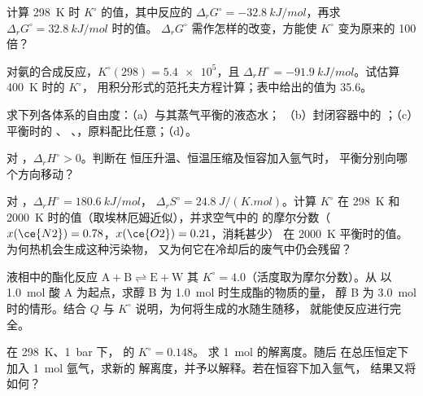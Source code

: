\begin{exercise}[$\star$]\label{exo:b2:equilibrium-shifts:1}
计算 \qty{298}{K} 时 $K^\circ$ 的值，其中反应的 $\Delta_r G^\circ =
\qty{-32.8}{kJ/mol}$，再求 $\Delta_r G^\circ = \qty{+32.8}{kJ/mol}$ 时的值。
$\Delta_r G^\circ$ 需作怎样的改变，方能使 $K^\circ$ 变为原来的 100 倍？
\end{exercise}

\begin{exercise}[$\star$]\label{exo:b2:equilibrium-shifts:2}
对氨的合成反应，$K^\circ(298) = \num{5.4e5}$，且 $\Delta_r H^\circ =
\qty{-91.9}{kJ/mol}$。试估算 \qty{400}{K} 时的 $K^\circ$，
用积分形式的范托夫方程计算；表中给出的值为 35.6。
\end{exercise}

\begin{exercise}[$\star$]\label{exo:b2:equilibrium-shifts:3}
求下列各体系的自由度：（a）与其蒸气平衡的液态水；
（b）封闭容器中的 ；（c）平衡时的 、
、，原料配比任意；（d）。
\end{exercise}

\begin{exercise}[$\star$]\label{exo:b2:equilibrium-shifts:4}
对 ，$\Delta_r H^\circ > 0$。判断在
恒压升温、恒温压缩及恒容加入氩气时，
平衡分别向哪个方向移动？
\end{exercise}

\begin{exercise}[$\star\star$]\label{exo:b2:equilibrium-shifts:5}
对 ，$\Delta_r H^\circ = \qty{180.6}{kJ/mol}$，
$\Delta_r S^\circ = \qty{24.8}{J/(K.mol)}$。计算 $K^\circ$ 在 \qty{298}{K}
和 \qty{2000}{K} 时的值（取埃林厄姆近似），并求空气中的
 的摩尔分数（$x(\ce{N2}) = 0.78$，$x(\ce{O2}) = 0.21$，消耗甚少）
在 \qty{2000}{K} 平衡时的值。为何热机会生成这种污染物，
又为何它在冷却后的废气中仍会残留？
\end{exercise}

\begin{exercise}[$\star\star$]\label{exo:b2:equilibrium-shifts:6}
液相中的酯化反应 $\mathrm{A + B \rightleftharpoons E + W}$
其 $K^\circ = 4.0$（活度取为摩尔分数）。从
以 \qty{1.0}{mol} 酸 A 为起点，求醇 B 为 \qty{1.0}{mol} 时生成酯的物质的量，
醇 B 为 \qty{3.0}{mol} 时的情形。结合 $Q$ 与 $K^\circ$ 说明，为何将生成的水随生随移，
就能使反应进行完全。
\end{exercise}

\begin{exercise}[$\star\star$]\label{exo:b2:equilibrium-shifts:7}
在 \qty{298}{K}、\qty{1}{bar} 下， 的 $K^\circ = 0.148$。
求 \qty{1}{mol}  的解离度。随后
在总压恒定下加入 \qty{1}{mol} 氩气，求新的
解离度，并予以解释。若在恒容下加入氩气，
结果又将如何？
\end{exercise}

